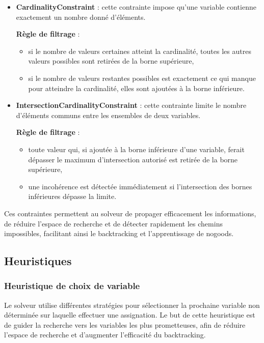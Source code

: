 \documentclass{article}
\begin{document}
\begin{itemize}
    \item \textbf{CardinalityConstraint} : cette contrainte impose qu'une variable contienne exactement un nombre donné d'éléments. 

    \textbf{Règle de filtrage} : 
    \begin{itemize}
        \item si le nombre de valeurs certaines atteint la cardinalité, toutes les autres valeurs possibles sont retirées de la borne supérieure,
        \item si le nombre de valeurs restantes possibles est exactement ce qui manque pour atteindre la cardinalité, elles sont ajoutées à la borne inférieure.
    \end{itemize}


    \item \textbf{IntersectionCardinalityConstraint} : cette contrainte limite le nombre d'éléments communs entre les ensembles de deux variables. 
    
    \textbf{Règle de filtrage} : 
    \begin{itemize}
        \item toute valeur qui, si ajoutée à la borne inférieure d'une variable, ferait dépasser le maximum d'intersection autorisé est retirée de la borne supérieure,
        \item une incohérence est détectée immédiatement si l'intersection des bornes inférieures dépasse la limite.
    \end{itemize}
\end{itemize}

Ces contraintes permettent au solveur de propager efficacement les informations, de réduire l'espace de recherche et de détecter rapidement les chemins impossibles, facilitant ainsi le backtracking et l'apprentissage de nogoods.


\subsection{Heuristiques}
\subsubsection{Heuristique de choix de variable}

Le solveur utilise différentes stratégies pour sélectionner la prochaine variable non déterminée sur laquelle effectuer une assignation. 
Le but de cette heuristique est de guider la recherche vers les variables les plus prometteuses, afin de réduire l'espace de recherche et d'augmenter l'efficacité du backtracking.
\end{document}

